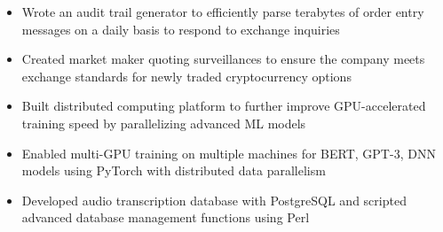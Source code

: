 \documentclass[11pt,letterpaper]{article}
\begin{document}
  {\fontsize{12}{12}}

  \begin{itemize}
    \item{Wrote an audit trail generator to efficiently parse terabytes of order entry messages on a daily basis to respond to exchange inquiries}
    \item{Created market maker quoting surveillances to ensure the company meets exchange standards for newly traded cryptocurrency options}
  \end{itemize}

  {\fontsize{12}{12}}

  \begin{itemize}
    \item{Built distributed computing platform to further improve GPU-accelerated training speed by parallelizing advanced ML models}
    \item{Enabled multi-GPU training on multiple machines for BERT, GPT-3, DNN models using PyTorch with distributed data parallelism}
  \end{itemize}

  {\fontsize{12}{12}}

  \begin{itemize}
    \item{Developed audio transcription database with PostgreSQL and scripted advanced database management functions using Perl}
  \end{itemize}

  {\fontsize{12}{12}}
\end{document}
